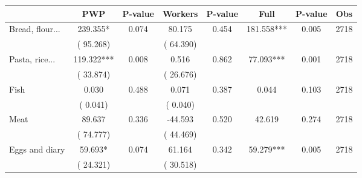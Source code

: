 
\begin{tabular}{l*{7}{c}}\hline&\multicolumn{1}{c}{PWP}&\multicolumn{1}{c}{P-value}&\multicolumn{1}{c}{Workers}&\multicolumn{1}{c}{P-value}&\multicolumn{1}{c}{Full}&\multicolumn{1}{c}{P-value}&\multicolumn{1}{c}{Obs} \\ \hline

 Bread, flour...       &            239.355*       &        0.074  &             80.175       &        0.454  &            181.558***       &              0.005 &  2718 \\ 
                       &       (      95.268)             &                               &       (      64.390)                     &                               &                                               &                                &                      \\ 

 Pasta, rice...       &            119.322***       &        0.008  &              0.516       &        0.862  &             77.093***       &              0.001 &  2718 \\ 
                       &       (      33.874)             &                               &       (      26.676)                     &                               &                                               &                                &                      \\ 

 Fish       &              0.030       &        0.488  &              0.071       &        0.387  &              0.044       &              0.103 &  2718 \\ 
                       &       (       0.041)             &                               &       (       0.040)                     &                               &                                               &                                &                      \\ 

 Meat       &             89.637       &        0.336  &            -44.593       &        0.520  &             42.619       &              0.274 &  2718 \\ 
                       &       (      74.777)             &                               &       (      44.469)                     &                               &                                               &                                &                      \\ 

 Eggs and diary       &             59.693*       &        0.074  &             61.164       &        0.342  &             59.279***       &              0.005 &  2718 \\ 
                       &       (      24.321)             &                               &       (      30.518)                     &                               &                                               &                                &                      \\ 


\end{tabular}
